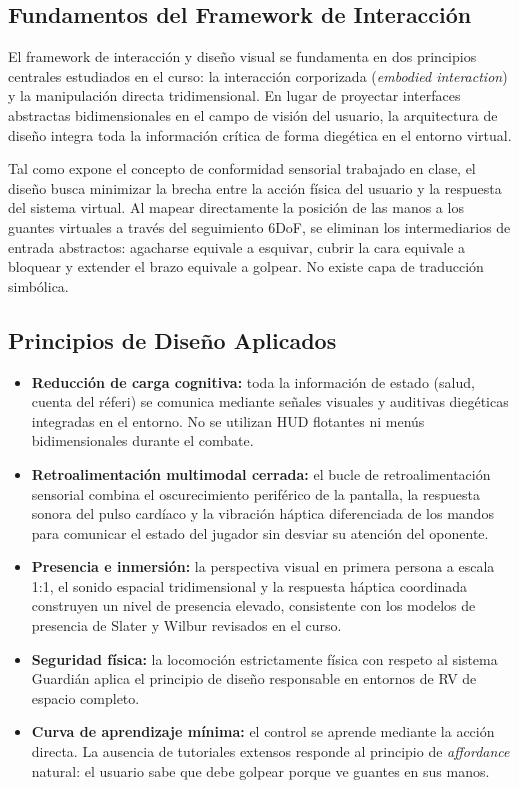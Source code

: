 \subsection{Fundamentos del Framework de Interacción}
El framework de interacción y diseño visual se fundamenta en dos principios centrales estudiados en el curso: la interacción corporizada (\emph{embodied interaction}) y la manipulación directa tridimensional. En lugar de proyectar interfaces abstractas bidimensionales en el campo de visión del usuario, la arquitectura de diseño integra toda la información crítica de forma diegética en el entorno virtual.

Tal como expone el concepto de conformidad sensorial trabajado en clase, el diseño busca minimizar la brecha entre la acción física del usuario y la respuesta del sistema virtual. Al mapear directamente la posición de las manos a los guantes virtuales a través del seguimiento 6DoF, se eliminan los intermediarios de entrada abstractos: agacharse equivale a esquivar, cubrir la cara equivale a bloquear y extender el brazo equivale a golpear. No existe capa de traducción simbólica.

\subsection{Principios de Diseño Aplicados}
\begin{itemize}
  \item \textbf{Reducción de carga cognitiva:} toda la información de estado (salud, cuenta del réferi) se comunica mediante señales visuales y auditivas diegéticas integradas en el entorno. No se utilizan HUD flotantes ni menús bidimensionales durante el combate.
  \item \textbf{Retroalimentación multimodal cerrada:} el bucle de retroalimentación sensorial combina el oscurecimiento periférico de la pantalla, la respuesta sonora del pulso cardíaco y la vibración háptica diferenciada de los mandos para comunicar el estado del jugador sin desviar su atención del oponente.
  \item \textbf{Presencia e inmersión:} la perspectiva visual en primera persona a escala 1:1, el sonido espacial tridimensional y la respuesta háptica coordinada construyen un nivel de presencia elevado, consistente con los modelos de presencia de Slater y Wilbur revisados en el curso.
  \item \textbf{Seguridad física:} la locomoción estrictamente física con respeto al sistema Guardián aplica el principio de diseño responsable en entornos de RV de espacio completo.
  \item \textbf{Curva de aprendizaje mínima:} el control se aprende mediante la acción directa. La ausencia de tutoriales extensos responde al principio de \emph{affordance} natural: el usuario sabe que debe golpear porque ve guantes en sus manos.
\end{itemize}

